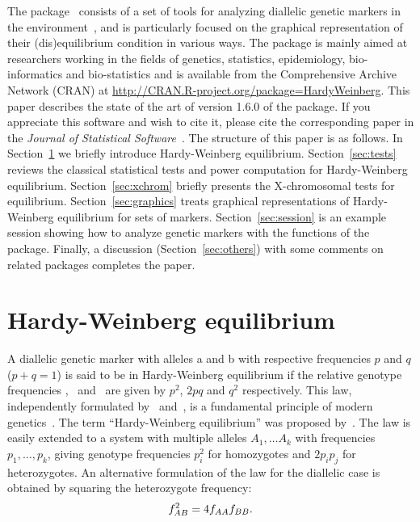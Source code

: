 \documentclass[nojss]{jss}
\begin{document}
The  package~\citep{Graffel26} consists of a set of
tools for analyzing diallelic genetic markers in the 
environment~\citep{RRR}, and is particularly focused on the graphical
representation of their (dis)equilibrium condition in various ways.
The package is mainly aimed at researchers working in the fields of
genetics, statistics, epidemiology, bio-informatics and bio-statistics
and is available from the Comprehensive  Archive Network
(CRAN) at \url{http://CRAN.R-project.org/package=HardyWeinberg}.
This paper describes the state of the art of version 1.6.0 of the package. 
If you appreciate this software and wish to cite it, please cite the
corresponding paper in the {\it Journal of Statistical 
Software}~\citep{Graffel26}. 
The structure of this paper is as follows. In
Section~\ref{sec:hardyweinberg} we briefly introduce Hardy-Weinberg
equilibrium. Section~\ref{sec:tests} reviews the classical statistical
tests and power computation for Hardy-Weinberg
equilibrium. Section~\ref{sec:xchrom} briefly presents the X-chromosomal tests
for equilibrium. Section~\ref{sec:graphics} treats graphical
representations of Hardy-Weinberg equilibrium for sets of
markers. Section~\ref{sec:session} is an example session showing how
to analyze genetic markers with the functions of the package. Finally,
a discussion (Section~\ref{sec:others}) with some comments on related
packages completes the paper.


\section{Hardy-Weinberg equilibrium}
\label{sec:hardyweinberg}

A diallelic genetic marker with alleles {\sc a} and {\sc b} with
respective frequencies $p$ and $q$ ($p + q = 1$) is said to be in
Hardy-Weinberg equilibrium if the relative genotype frequencies \faa,
\fab\ and \fbb\ are given by $p^2$, $2pq$ and $q^2$ respectively. This
law, independently formulated by~\citet{Hardy} and~\citet{Weinberg},
is a fundamental principle of modern genetics~\citep{Crow}. The term
``Hardy-Weinberg equilibrium'' was proposed by~\citet{Stern}. The law
is easily extended to a system with multiple alleles $A_1, \ldots A_k$
with frequencies $p_1, \ldots, p_k$, giving genotype frequencies
$p_i^2$ for homozygotes and $2p_ip_j$ for heterozygotes. An
alternative formulation of the law for the diallelic case is obtained
by squaring the heterozygote frequency:
\begin{equation}
f_{AB}^2 = 4 f_{AA} f_{BB}.
\label{eq:hwe}
\end{equation}
\end{document}
